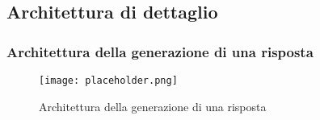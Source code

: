 \subsection{Architettura di dettaglio}
\label{sec:architettura_di_dettaglio}

\subsubsection{Architettura della generazione di una risposta}
\label{sec:architettura_generazione_risposta}

\begin{figure}[h]
    \centering
    \texttt{[image: placeholder.png]}
    \caption{Architettura della generazione di una risposta}
\end{figure}

